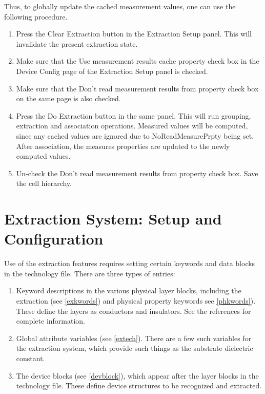 Thus, to globally update the cached measurement values, one can use
the following procedure.

\begin{enumerate}
\item{Press the {\cb Clear Extraction} button in the {\cb Extraction
Setup} panel.  This will invalidate the present extraction state.}

\item{Make sure that the {\cb Use measurement results cache property}
check box in the {\cb Device Config} page of the {\cb Extraction
Setup} panel is checked.}

\item{Make sure that the {\cb Don't read measurement results from
property} check box on the same page is also checked.}

\item{Press the {\cb Do Extraction} button in the same panel.  This
will run grouping, extraction and association operations.  Measured
values will be computed, since any cached values are ignored due to
{\et NoReadMeasurePrpty} being set.  After association, the {\et
measures} properties are updated to the newly computed values.}

\item{Un-check the {\cb Don't read measurement results from property}
check box.  Save the cell hierarchy.}
\end{enumerate}


\section{Extraction System: Setup and Configuration}
\label{extsetup}

Use of the extraction features requires setting certain keywords and
data blocks in the technology file.  There are three types of entries: 

\begin{enumerate}
\item{Keyword descriptions in the various physical layer blocks,
including the extraction (see \ref{exkwords}) and physical property
keywords see \ref{phkwords}).  These define the layers as conductors
and insulators.  See the references for complete information.}

\item{Global attribute variables (see \ref{extech}).  There are a few
such variables for the extraction system, which provide such things as
the substrate dielectric constant.}

\item{The device blocks (see \ref{devblock}), which appear after the
layer blocks in the technology file.  These define device structures
to be recognized and extracted.}
\end{enumerate}

